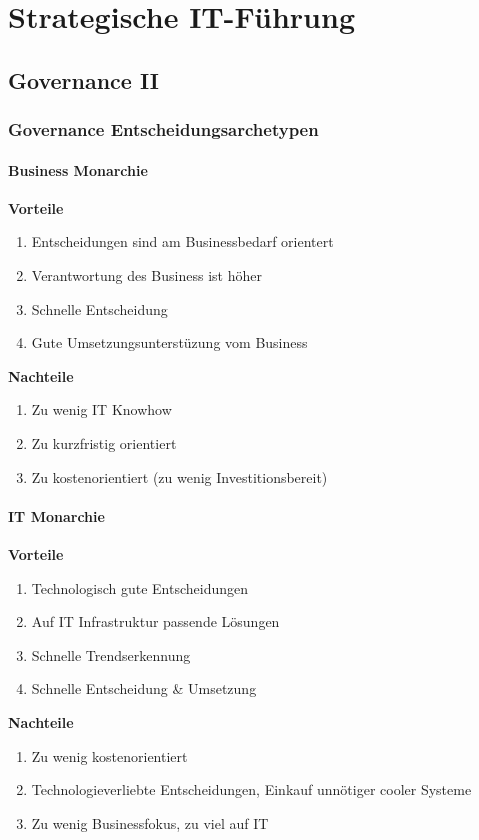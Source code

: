 \chapter{Strategische IT-Führung}

\section{Governance II}
\subsection{Governance Entscheidungsarchetypen}
\subsubsection{Business Monarchie}
\textbf{Vorteile}
\begin{enumerate}
	\item Entscheidungen sind am Businessbedarf orientert
	\item Verantwortung des Business ist höher
	\item Schnelle Entscheidung
	\item Gute Umsetzungsunterstüzung vom Business
\end{enumerate}
\textbf{Nachteile}
\begin{enumerate}
	\item Zu wenig IT Knowhow
	\item Zu kurzfristig orientiert
	\item Zu kostenorientiert (zu wenig Investitionsbereit)
\end{enumerate}
\subsubsection{IT Monarchie}
\textbf{Vorteile}
\begin{enumerate}
	\item Technologisch gute Entscheidungen
	\item Auf IT Infrastruktur passende Lösungen
	\item Schnelle Trendserkennung
	\item Schnelle Entscheidung \& Umsetzung
\end{enumerate}
\textbf{Nachteile}
\begin{enumerate}
	\item Zu wenig kostenorientiert
	\item Technologieverliebte Entscheidungen, Einkauf unnötiger cooler Systeme
	\item Zu wenig Businessfokus, zu viel auf IT
\end{enumerate}
